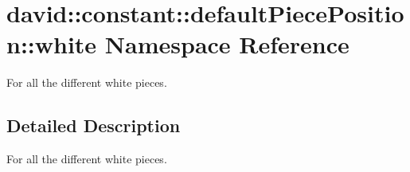 \hypertarget{namespacedavid_1_1constant_1_1defaultPiecePosition_1_1white}{}\section{david\+:\+:constant\+:\+:default\+Piece\+Position\+:\+:white Namespace Reference}
\label{namespacedavid_1_1constant_1_1defaultPiecePosition_1_1white}


For all the different white pieces.  




\subsection{Detailed Description}
For all the different white pieces. 